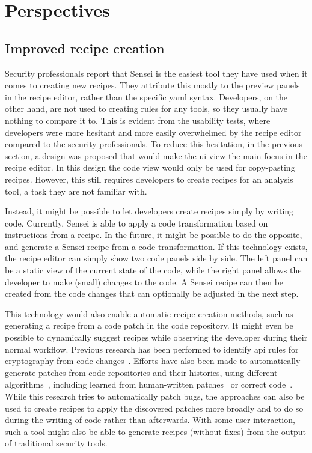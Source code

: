 \section{Perspectives}
\label{sec:sensei-perspectives}

\subsection{Improved recipe creation}
\label{sec:improvedrulecreation}
Security professionals report that Sensei is the easiest tool they have used when it comes to creating new recipes.
They attribute this mostly to the preview panels in the recipe editor, rather than the specific \gls{yaml} syntax.
Developers, on the other hand, are not used to creating rules for any tools, so they usually have nothing to compare it to.
This is evident from the usability tests, where developers were more hesitant and more easily overwhelmed by the recipe editor compared to the security professionals.
To reduce this hesitation, in the previous section, a design was proposed that would make the \gls{ui} view the main focus in the recipe editor.
In this design the code view would only be used for copy-pasting recipes.
However, this still requires developers to create recipes for an analysis tool, a task they are not familiar with.

Instead, it might be possible to let developers create recipes simply by writing code.
Currently, Sensei is able to apply a code transformation based on instructions from a recipe.
In the future, it might be possible to do the opposite, and generate a Sensei recipe from a code transformation.
If this technology exists, the recipe editor can simply show two code panels side by side.
The left panel can be a static view of the current state of the code, while the right panel allows the developer to make (small) changes to the code.
A Sensei recipe can then be created from the code changes that can optionally be adjusted in the next step.

This technology would also enable automatic recipe creation methods, such as generating a recipe from a code patch in the code repository.
It might even be possible to dynamically suggest recipes while observing the developer during their normal workflow.
Previous research has been performed to identify \gls{api} rules for cryptography from code changes~\cite{paletov2018inferring}.
Efforts have also been made to automatically generate patches from code repositories and their histories, using different algorithms~\cite{weimer2009automatically}, including learned from human-written patches~\cite{kim2013automatic} or correct code~\cite{long2016automatic}.
While this research tries to automatically patch bugs, the approaches can also be used to create recipes to apply the discovered patches more broadly and to do so during the writing of code rather than afterwards.
With some user interaction, such a tool might also be able to generate recipes (without fixes) from the output of traditional security tools.

